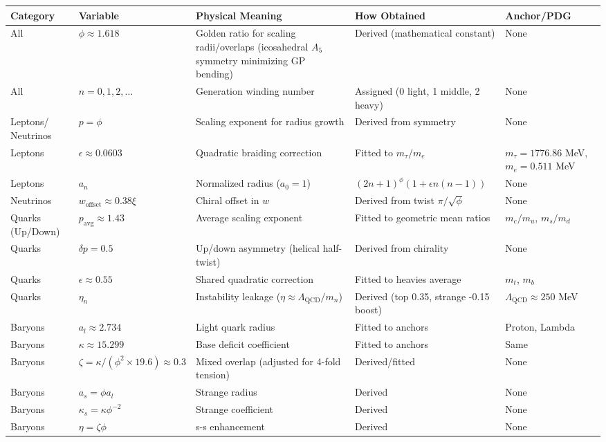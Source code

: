 \documentclass{article}
\begin{document}
\begin{sidewaystable}[p]
\centering
\begin{tabular}{|p{2cm}|p{3cm}|p{6cm}|p{6cm}|p{3cm}|}
\hline
Category & Variable & Physical Meaning & How Obtained & Anchor/PDG \\
\hline
All & $\phi \approx 1.618$ & Golden ratio for scaling radii/overlaps (icosahedral $A_5$ symmetry minimizing GP bending) & Derived (mathematical constant) & None \\
All & $n = 0,1,2,\dots$ & Generation winding number & Assigned (0 light, 1 middle, 2 heavy) & None \\
Leptons/ Neutrinos & $p = \phi$ & Scaling exponent for radius growth & Derived from symmetry & None \\
Leptons & $\epsilon \approx 0.0603$ & Quadratic braiding correction & Fitted to $m_\tau / m_e$ & $m_\tau=1776.86$ MeV, $m_e=0.511$ MeV \\
Leptons & $a_n$ & Normalized radius ($a_0=1$) & $(2n+1)^\phi (1 + \epsilon n(n-1))$ & None \\
Neutrinos & $w_{\text{offset}} \approx 0.38 \xi$ & Chiral offset in $w$ & Derived from twist $\pi / \sqrt{\phi}$ & None \\
Quarks (Up/Down) & $p_{\text{avg}} \approx 1.43$ & Average scaling exponent & Fitted to geometric mean ratios & $m_c/m_u$, $m_s/m_d$ \\
Quarks & $\delta p = 0.5$ & Up/down asymmetry (helical half-twist) & Derived from chirality & None \\
Quarks & $\epsilon \approx 0.55$ & Shared quadratic correction & Fitted to heavies average & $m_t$, $m_b$ \\
Quarks & $\eta_n$ & Instability leakage ($\eta \approx \Lambda_{\text{QCD}} / m_n$) & Derived (top 0.35, strange -0.15 boost) & $\Lambda_{\text{QCD}} \approx 250$ MeV \\
Baryons & $a_l \approx 2.734$ & Light quark radius & Fitted to anchors & Proton, Lambda \\
Baryons & $\kappa \approx 15.299$ & Base deficit coefficient & Fitted to anchors & Same \\
Baryons & $\zeta = \kappa / (\phi^2 \times 19.6) \approx 0.3$ & Mixed overlap (adjusted for 4-fold tension) & Derived/fitted & None \\
Baryons & $a_s = \phi a_l$ & Strange radius & Derived & None \\
Baryons & $\kappa_s = \kappa \phi^{-2}$ & Strange coefficient & Derived & None \\
Baryons & $\eta = \zeta \phi$ & s-s enhancement & Derived & None \\

\end{tabular}
\end{sidewaystable}
\end{document}
